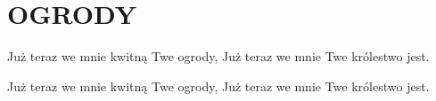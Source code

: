 \documentclass[../../../songbook.tex]{subfiles}
\begin{document}
\TabPositions{8cm} %
\section*{OGRODY}
{}
\vspace{0.5cm}
Już teraz we mnie kwitną Twe ogrody,		 \newline	
Już teraz we mnie Twe królestwo jest.		 \newline	

Już teraz we mnie kwitną Twe ogrody,		  \newline	
Już teraz we mnie Twe królestwo jest.		 \newline	
\end{document}
